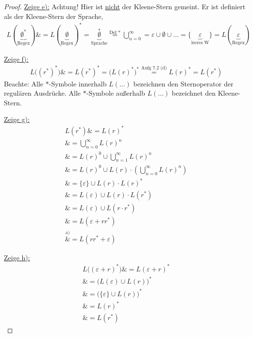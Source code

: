 \begin{proof}
	\underline{Zeige e):}
	Achtung! Hier ist \underline{nicht} der Kleene-Stern gemeint. 
	Er ist definiert als der Kleene-Stern der Sprache,
	\begin{align*}
		L(\underbrace{\emptyset^\ast}_{\text{Regex}})
		\overset{\text{}}&=
		L(\underbrace{\emptyset}_{\text{Regex}})^\ast
		\overset{\text{}}=
		\underbrace{\emptyset}_{\text{Sprache}}^\ast
		\overset{\text{Def }\ast}=
		\bigcup\limits_{n=0}^\infty
		\overset{\text{}}=
		\varepsilon\cup\emptyset\cup\ldots
		\overset{\text{}}=
		\lbrace\underbrace{\varepsilon}_{\text{leeres W}}\rbrace
		\overset{\text{}}=
		L(\underbrace{\varepsilon}_{\text{Regex}})
	\end{align*}
	
	\underline{Zeige f):}
	\begin{align*}
		L\big((r^\ast)^\ast\big)
		\overset{\text{}}&=
		L(r^\ast)^\ast
		\overset{\text{}}=
		\big(L(r)^\ast\big)^\ast
		\overset{\text{Aufg 7.2 (d)}}=
		L(r)^\ast
		\overset{\text{}}=
		L(r^\ast)
	\end{align*}
	Beachte: Alle $\ast$-Symbole innerhalb $L(\ldots)$ bezeichnen den Sternoperator der regulären Ausdrücke.
	Alle $\ast$-Symbole außerhalb $L(\ldots)$ bezeichnet den Kleene-Stern.
	
	\underline{Zeige g):}
	\begin{align*}
		L(r^\ast)
		\overset{\text{}}&=
		L(r)^\ast\\
		\overset{\text{}}&=
		\bigcup\limits_{n=0}^\infty L(r)^n\\
		\overset{\text{}}&=
		L(r)^0\cup\bigcup\limits_{n=1}^\infty L(r)^n\\
		\overset{\text{}}&=
		L(r)^0\cup L(r)\cdot\left(\bigcup\limits_{n=0}^\infty L(r)^n\right)\\
		\overset{\text{}}&=
		\lbrace\varepsilon\rbrace\cup L(r)\cdot L(r)^\ast\\
		\overset{\text{}}&=
		L(\varepsilon)\cup L(r)\cdot L(r^\ast)\\
		\overset{\text{}}&=
		L(\varepsilon)\cup L(r\cdot r^\ast)\\
		\overset{\text{}}&=
		L(\varepsilon+rr^\ast)\\
		\overset{\text{a)}}&=
		L(rr^\ast+\varepsilon)
	\end{align*}
	
	\underline{Zeige h):}
	\begin{align*}
		L\big((\varepsilon+r)^\ast\big)
		\overset{\text{}}&=
		L(\varepsilon+r)^\ast\\
		\overset{\text{}}&=
		\big(L(\varepsilon)\cup L(r)\big)^\ast\\
		\overset{\text{}}&=
		\big(\lbrace\varepsilon\rbrace\cup L(r)\big)^\ast\\
		\overset{\text{}}&=
		L(r)^\ast\\
		\overset{\text{}}&=
		L(r^\ast)
	\end{align*}
\end{proof}

